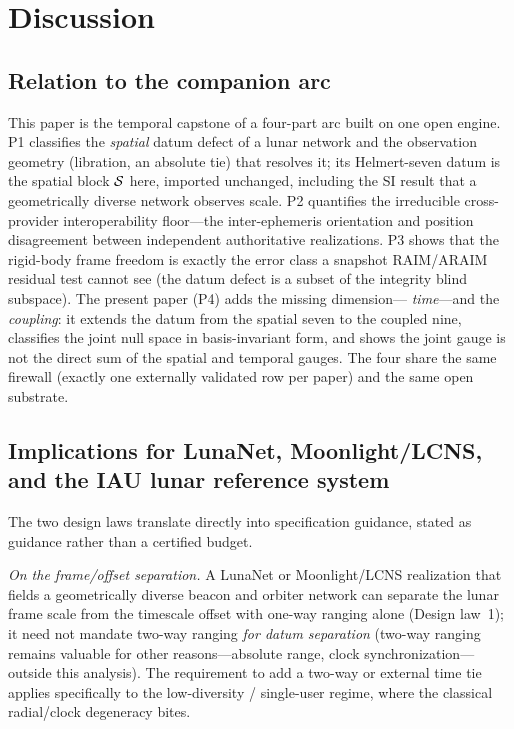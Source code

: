 \section{Discussion}
\label{sec:discussion}

\subsection{Relation to the companion arc}
\label{sec:companions}

This paper is the temporal capstone of a four-part arc built on one open engine. P1
\citep{baweja2026datum} classifies the \emph{spatial} datum defect of a lunar network and
the observation geometry (libration, an absolute tie) that resolves it; its Helmert-seven
datum is the spatial block $\mathcal{S}$ here, imported unchanged, including the SI result that a
geometrically diverse network observes scale. P2 \citep{baweja2026interop} quantifies the
irreducible cross-provider interoperability floor---the inter-ephemeris orientation and
position disagreement between independent authoritative realizations. P3
\citep{baweja2026commonmode} shows that the rigid-body frame freedom is exactly the
error class a snapshot RAIM/ARAIM residual test cannot see (the datum defect is a subset of
the integrity blind subspace). The present paper (P4) adds the missing dimension---%
\emph{time}---and the \emph{coupling}: it extends the datum from the spatial seven to the
coupled nine, classifies the joint null space in basis-invariant form, and shows the joint
gauge is not the direct sum of the spatial and temporal gauges. The four share the same
firewall (exactly one externally validated row per paper) and the same open substrate.

\subsection{Implications for LunaNet, Moonlight/LCNS, and the IAU lunar reference system}
\label{sec:implications}

The two design laws translate directly into specification guidance, stated as \Modelled{}
guidance rather than a certified budget.

\emph{On the frame/offset separation.} A LunaNet or Moonlight/LCNS realization
\citep{israel2020lunanet,fienga2024moonlight,lnis2023} that fields a geometrically diverse
beacon and orbiter network can separate the lunar frame scale from the timescale offset with
one-way ranging alone (Design law~1); it need not mandate two-way ranging \emph{for datum
separation} (two-way ranging remains valuable for other reasons---absolute range, clock
synchronization---outside this analysis). The requirement to add a two-way or external time
tie applies specifically to the low-diversity / single-user regime, where the classical
radial/clock degeneracy bites.


